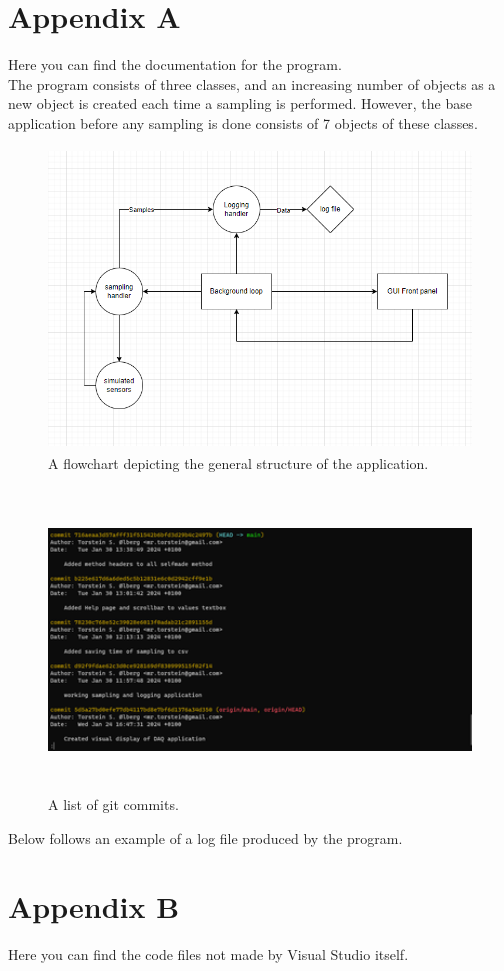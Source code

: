 \documentclass[11pt, A4paper, norsk]{article}
\begin{document}
	\section{Appendix A}
Here you can find the documentation for the program. \\
The program consists of three classes, and an increasing number of objects as a new object is created each time a sampling is performed. However, the base application before any sampling is done consists of 7 objects of these classes.
		\begin{figure}
\includegraphics[width=13cm, height=8cm]{Flow_chart.png}
\caption{A flowchart depicting the general structure of the application.}
		\end{figure}
		\begin{figure}
\includegraphics[width=13cm, height=8cm]{git_log.png}
\caption{A list of git commits.}
		\end{figure}
Below follows an example of a log file produced by the program.


	\section{Appendix B}
Here you can find the code files not made by Visual Studio itself.


\end{document}
